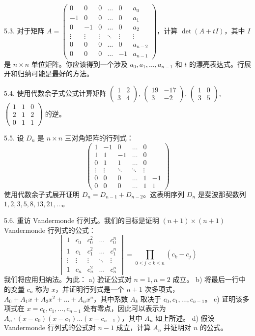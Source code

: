 5.3. 对于矩阵 $A = \begin{pmatrix} 0 & 0 & 0 & \dots & 0 & a_0 \\ -1 & 0 & 0 & \dots & 0 & a_1 \\ 0 & -1 & 0 & \dots & 0 & a_2 \\ \vdots & \vdots & \vdots & \ddots & \vdots & \vdots \\ 0 & 0 & 0 & \dots & 0 & a_{n-2} \\ 0 & 0 & 0 & \dots & -1 & a_{n-1} \end{pmatrix}$，计算 $\det(A + tI)$，其中 $I$ 是 $n \times n$ 单位矩阵。你应该得到一个涉及 $a_0, a_1, \dots, a_{n-1}$ 和 $t$ 的漂亮表达式。行展开和归纳可能是最好的方法。

5.4. 使用代数余子式公式计算矩阵 $\begin{pmatrix} 1 & 2 \\ 3 & 4 \end{pmatrix}$, $\begin{pmatrix} 19 & -17 \\ 3 & -2 \end{pmatrix}$, $\begin{pmatrix} 1 & 0 \\ 3 & 5 \end{pmatrix}$, $\begin{pmatrix} 1 & 1 & 0 \\ 2 & 1 & 2 \\ 0 & 1 & 1 \end{pmatrix}$ 的逆。

5.5. 设 $D_n$ 是 $n \times n$ 三对角矩阵的行列式：
$$
\begin{pmatrix}
1 & -1 & 0 & \dots & 0 \\
1 & 1 & -1 & \dots & 0 \\
0 & 1 & 1 & \dots & 0 \\
\vdots & \vdots & \ddots & \ddots & \vdots \\
0 & 0 & 0 & \dots & 1 & -1 \\
0 & 0 & 0 & \dots & 1 & 1
\end{pmatrix}
$$
使用代数余子式展开证明 $D_n = D_{n-1} + D_{n-2}$。这表明序列 $D_n$ 是斐波那契数列 $1, 2, 3, 5, 8, 13, 21, \dots$。

5.6. 重访 Vandermonde 行列式。我们的目标是证明 $(n+1) \times (n+1)$ Vandermonde 行列式的公式：
$$
\begin{vmatrix}
1 & c_0 & c_0^2 & \dots & c_0^n \\
1 & c_1 & c_1^2 & \dots & c_1^n \\
\vdots & \vdots & \vdots & \ddots & \vdots \\
1 & c_n & c_n^2 & \dots & c_n^n
\end{vmatrix} = \prod_{0 \le j < k \le n} (c_k - c_j)
$$
我们将应用归纳法。为此：
a) 验证公式对 $n=1, n=2$ 成立。
b) 将最后一行中的变量 $c_n$ 称为 $x$，并证明行列式是一个 $n+1$ 次多项式，$A_0 + A_1 x + A_2 x^2 + \dots + A_n x^n$，其中系数 $A_k$ 取决于 $c_0, c_1, \dots, c_{n-1}$。
c) 证明该多项式在 $x = c_0, c_1, \dots, c_{n-1}$ 处有零点，因此可以表示为 $A_n \cdot (x - c_0)(x - c_1) \dots (x - c_{n-1})$，其中 $A_n$ 如上所述。
d) 假设 Vandermonde 行列式的公式对 $n-1$ 成立，计算 $A_n$ 并证明对 $n$ 的公式。

